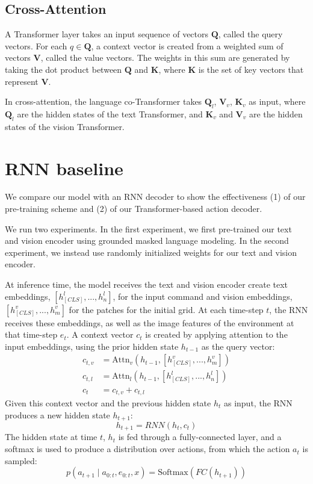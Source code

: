 \documentclass[11pt]{article}
\begin{document}
\subsection{Cross-Attention}
A Transformer layer takes an input sequence of vectors $\mathbf{Q}$, called the query vectors. 
%
For each $q\in \mathbf{Q}$, a context vector is created from a weighted sum of vectors $\mathbf{V}$, called the value vectors.
%
The weights in this sum are generated by taking the dot product between $\mathbf{Q}$ and $\mathbf{K}$, where $\mathbf{K}$ is the set of key vectors that represent $\mathbf{V}$.

In cross-attention, the language co-Transformer takes $\mathbf{Q}_{l}$, $\mathbf{V}_{v}$, $\mathbf{K}_{v}$ as input, where $\mathbf{Q}_l$ are the hidden states of the text Transformer, and $\mathbf{K}_{v}$ and $\mathbf{V}_{v}$ are the hidden states of the vision Transformer.

\section{RNN baseline}
We compare our model with an RNN decoder to show the effectiveness (1) of our pre-training scheme and (2) of our Transformer-based action decoder.
%

We run two experiments.
%
In the first experiment, we first pre-trained our text and vision encoder using grounded masked language modeling. 
%
In the second experiment, we instead use randomly initialized weights for our text and vision encoder.

%
At inference time, the model receives the text and vision encoder create text embeddings, $[h_{[CLS]}^{l},...,h_{n}^{l}]$, for the input command and vision embeddings, $[h_{[CLS]}^{v},...,h_{m}^{v}]$ for the patches for the initial grid.
%
At each time-step $t$, the RNN receives these embeddings, as well as the image features of the environment at that time-step $e_t$.
%
A context vector $c_t$ is created by applying attention to the input embeddings, using the prior hidden state $h_{t-1}$ as the query vector:
\begin{align*}
c_{t,v} &= \text{Attn}_v(h_{t-1}, [h_{[CLS]}^{v},...,h_{m}^{v}])\\
c_{t,l} &= \text{Attn}_l(h_{t-1}, [h_{[CLS]}^{l},...,h_{n}^{l}])\\
c_t &= c_{t,v} + c_{t,l}
\end{align*}
Given this context vector and the previous hidden state $h_{t}$ as input, the RNN produces a new hidden state $h_{t+1}$:
$$
h_{t+1} = RNN(h_t, c_t)
$$
The hidden state at time $t$, $h_t$ is fed through a fully-connected layer, and a softmax is used to produce a distribution over actions, from which the action $a_t$ is sampled:
$$
p(a_{t+1} \mid a_{0:t}, e_{0:t}, x) = \text{Softmax}(FC(h_{t+1}))
$$
%
\end{document}
